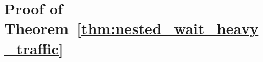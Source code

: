 \documentclass[preprint]{article}
\theoremstyle{plain}
\theoremstyle{definition}
\theoremstyle{remark}
\begin{document}





\section{Proof of Theorem~\ref{thm:nested_wait_heavy_traffic}}\label{appendix::proof of nested_wait_heavy_traffic}

\end{document}
